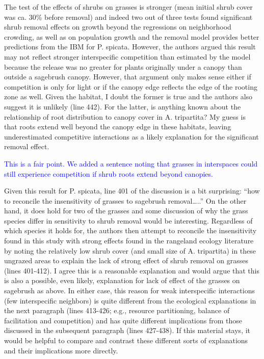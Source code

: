 \documentclass[12pt]{article}
\newcommand{\response}{\textcolor{blue}}
\begin{document}
The test of the effects of shrubs on grasses is stronger (mean initial shrub cover was ca. 30\% before
removal) and indeed two out of three tests found significant shrub removal effects on growth beyond
the regressions on neighborhood crowding, as well as on population growth and the removal model
provides better predictions from the IBM for P. spicata. However, the authors argued this result may
not reflect stronger interspecific competition than estimated by the model because the release was no
greater for plants originally under a canopy than outside a sagebrush canopy. However, that argument
only makes sense either if competition is only for light or if the canopy edge reflects the edge of the
rooting zone as well. Given the habitat, I doubt the former is true and the authors also suggest it is
unlikely (line 442). For the latter, is anything known about the relationship of root distribution to
canopy cover in A. tripartita? My guess is that roots extend well beyond the canopy edge in these
habitats, leaving underestimated competitive interactions as a likely explanation for the significant
removal effect.

\response{This is a fair point. We added a sentence noting that grasses in interspaces could still experience competition
if shrub roots extend beyond canopies.}

Given this result for P. spicata, line 401 of the discussion is a bit surprising: “how to reconcile the
insensitivity of grasses to sagebrush removal…..” On the other hand, it does hold for two of the grasses
and some discussion of why the grass species differ in sensitivity to shrub removal would be interesting.
Regardless of which species it holds for, the authors then attempt to reconcile the insensitivity found in
this study with strong effects found in the rangeland ecology literature by noting the relatively low shrub
cover (and small size of A. tripartita) in these ungrazed areas to explain the lack of strong effect of shrub
removal on grasses (lines 401-412). I agree this is a reasonable explanation and would argue that this is
also a possible, even likely, explanation for lack of effect of the grasses on sagebrush as above. In either
case, this reason for weak interspecific interactions (few interspecific neighbors) is quite different from
the ecological explanations in the next paragraph (lines 413-426; e.g., resource partitioning, balance of
facilitation and competition) and has quite different implications from those discussed in the
subsequent paragraph (lines 427-438). If this material stays, it would be helpful to compare and
contrast these different sorts of explanations and their implications more directly.
\end{document}
